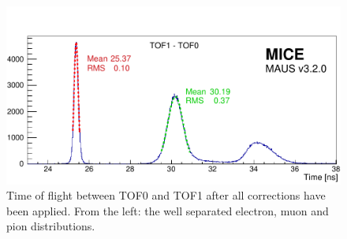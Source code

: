 


\begin{figure}[!htb]
  \begin{center}
    \includegraphics[width=0.6\columnwidth]{TOF_peaks.pdf}
    \caption{Time of flight between TOF0 and TOF1 after all corrections have been applied. From the left: the well separated electron, muon and pion distributions.}
    \label{fig:TOF_peaks}
  \end{center}
\end{figure}

